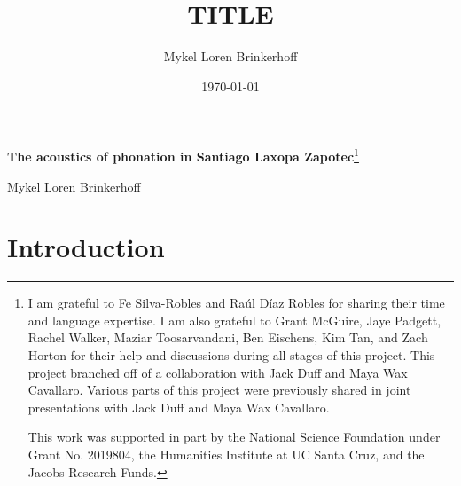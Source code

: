 \documentclass[12pt, letterpaper]{article}
\title{TITLE}
\author{Mykel Loren Brinkerhoff}
\date{\today}
\begin{document}

\onehalfspacing

\begin{center}
    {\Large \textbf{The acoustics of phonation in Santiago Laxopa Zapotec}}\footnote{I am grateful to Fe Silva-Robles and  Raúl Díaz Robles for sharing their time and language expertise. I am also grateful to Grant McGuire,  Jaye Padgett, Rachel Walker, Maziar Toosarvandani, Ben Eischens, Kim Tan, and Zach Horton for their help and discussions during all stages of this project. This project branched off of a collaboration with Jack Duff and Maya Wax Cavallaro. Various parts of this project were previously shared in joint presentations with Jack Duff and Maya Wax Cavallaro.
	
	This work was supported in part by the National Science Foundation under Grant No. 2019804, the Humanities Institute at UC Santa Cruz, and the Jacobs Research Funds.}
    \vspace{6pt}

    Mykel Loren Brinkerhoff
\end{center}
\thispagestyle{fancy}


\section{Introduction} \label{sec:Introduction}
\end{document}
